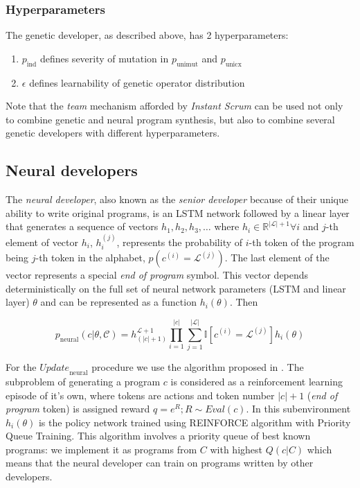 \subsubsection{Hyperparameters}
\label{sec:genhyper}

The genetic developer, as described above, has 2 hyperparameters:

\begin{enumerate}
    \item $p_\text{ind}$ defines severity of mutation in $p_\text{unimut}$ and $p_\text{unicx}$
    \item $\epsilon$ defines learnability of genetic operator distribution
\end{enumerate}

Note that the \emph{team} mechanism afforded by \emph{Instant Scrum} can be used not only to combine genetic and neural program synthesis, but also to combine several genetic developers with different hyperparameters.

\subsection{Neural developers}
\label{sec:neural}

The \emph{neural developer}, also known as the \emph{senior developer} because of their unique ability to write original programs, is an LSTM \cite{lstm} network followed by a linear layer that generates a sequence of vectors $h_{1},h_{2},h_{3},\dots$ where $h_i \in \mathbb{R}^{|\mathcal{L}| + 1} \forall i$ and $j$-th element of vector $h_i$, $h_i^{(j)}$, represents the probability of $i$-th token of the program being $j$-th token in the alphabet, $p(c^{(i)}=\mathcal{L}^{(j)})$.
The last element of the vector represents a special \emph{end of program} symbol.
This vector depends deterministically on the full set of neural network parameters (LSTM and linear layer) $\theta$ and can be represented as a function $h_i(\theta)$.
Then

\begin{equation}
    p_\text{neural}(c | \theta, \mathcal{C}) = h_{(|c|+1)}^{\mathcal{L}+1}
    \prod\limits_{i=1}^{|c|}
    \sum\limits_{j=1}^{|\mathcal{L}|} \mathbb{I}[c^{(i)}=\mathcal{L}^{(j)}]
    h_i(\theta)
\end{equation}

For the $\mathit{Update}_\text{neural}$ procedure we use the algorithm proposed in \cite{brain-coder}.
The subproblem of generating a program $c$ is considered as a reinforcement learning episode of it's own, where tokens are actions and token number $|c|+1$ (\emph{end of program} token) is assigned reward $q = e^R; R \sim Eval(c)$. 
In this subenvironment $h_i(\theta)$ is the policy network \cite[chapter 13]{thebook} trained using REINFORCE algorithm with Priority Queue Training.
This algorithm involves a priority queue of best known programs: we implement it as programs from $C$ with highest $Q(c|C)$ which means that the neural developer can train on programs written by other developers.


